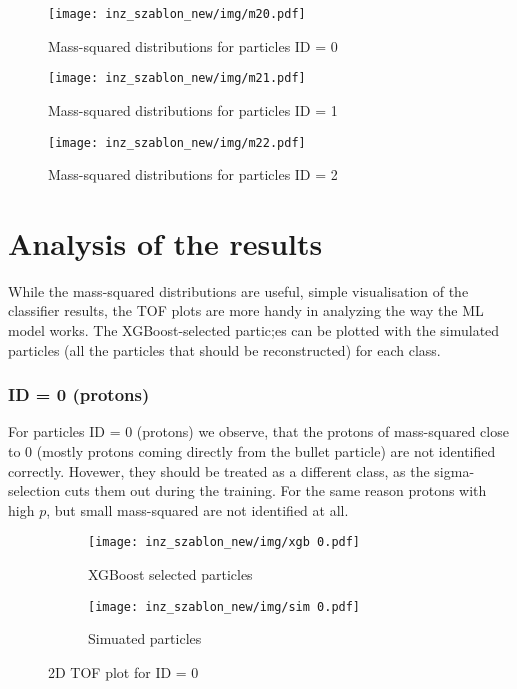 \begin{figure}[h!]
    \centering
    \texttt{[image: inz\_szablon\_new/img/m20.pdf]}
    \caption{Mass-squared distributions for particles ID = 0}
\end{figure}
\begin{figure}[h!]
    \centering
    \texttt{[image: inz\_szablon\_new/img/m21.pdf]}
    \caption{Mass-squared distributions for particles ID = 1}
\end{figure}
\begin{figure}[h!]
    \centering
    \texttt{[image: inz\_szablon\_new/img/m22.pdf]}
    \caption{Mass-squared distributions for particles ID = 2}
\end{figure}

\section{Analysis of the results}
While the mass-squared distributions are useful, simple visualisation of the classifier results, the TOF plots are more handy in analyzing the way the ML model works. The XGBoost-selected partic;es can be plotted with the simulated particles (all the particles that should be reconstructed) for each class.

\subsubsection{ID = 0 (protons)}
For particles ID = 0 (protons) we observe, that the protons of mass-squared close to 0 (mostly protons coming directly from the bullet particle) are not identified correctly. Hovewer, they should be treated as a different class, as the sigma-selection cuts them out during the training. For the same reason protons with high $p$, but small mass-squared are not identified at all.
\begin{figure}[H]
 \centering
    \begin{subfigure}[b]{0.7\linewidth} 
        \centering
        \texttt{[image: inz\_szablon\_new/img/xgb 0.pdf]}
        \caption{XGBoost selected particles}
        \vspace{0.3cm}
    \end{subfigure}
     \hfill
       \begin{subfigure}[b]{0.7\linewidth}
        \centering
        \texttt{[image: inz\_szablon\_new/img/sim 0.pdf]}
        \caption{Simuated particles}
        \vspace{0.3cm}
    \end{subfigure}
    \caption{2D TOF plot for ID = 0}
\end{figure}
\clearpage

